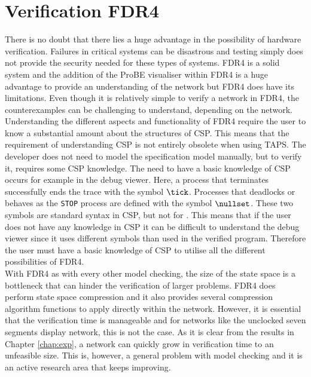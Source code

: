 \section{Verification FDR4}
There is no doubt that there lies a huge advantage in the possibility of hardware verification. Failures in critical systems can be disastrous and testing simply does not provide the security needed for these types of systems. FDR4 is a solid system and the addition of the ProBE visualiser within FDR4 is a huge advantage to provide an understanding of the network but FDR4 does have its limitations. Even though it is relatively simple to verify a network in FDR4, the counterexamples can be challenging to understand, depending on the network. Understanding the different aspects and functionality of FDR4 require the user to know a substantial amount about the structures of CSP. This means that the requirement of understanding CSP is not entirely obsolete when using TAPS. The developer does not need to model the specification model manually, but to verify it, requires some CSP knowledge. The need to have a basic knowledge of CSP occurs for example in the debug viewer. Here, a process that terminates successfully ends the trace with the symbol $\tick$. Processes that deadlocks or behaves as the \texttt{STOP} process are defined with the symbol $\nullset$. These two symbols are standard syntax in CSP, but not for \cspm{}. This means that if the user does not have any knowledge in CSP it can be difficult to understand the debug viewer since it uses different symbols than used in the verified \cspm{} program. Therefore the user must have a basic knowledge of CSP to utilise all the different possibilities of FDR4. \\

With FDR4 as with every other model checking, the size of the state space is a bottleneck that can hinder the verification of larger problems. FDR4 does perform state space compression and it also provides several compression algorithm functions to apply directly within the \cspm{} network.
However, it is essential that the verification time is manageable and for networks like the unclocked seven segments display network, this is not the case. As it is clear from the results in Chapter \ref{chap:exp}, a network can quickly grow in verification time to an unfeasible size. This is, however, a general problem with model checking and it is an active research area that keeps improving.